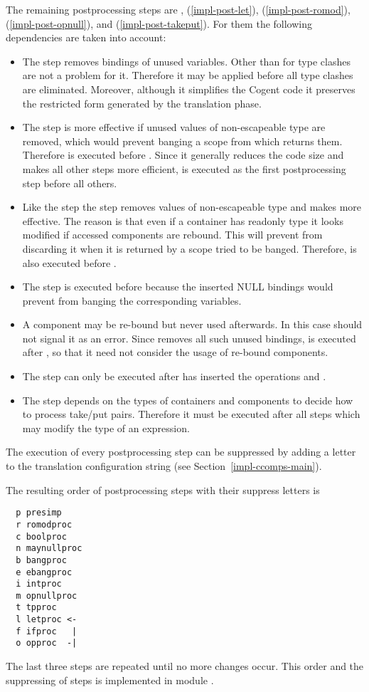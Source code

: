 The remaining postprocessing steps are , (\ref{impl-post-let}),  (\ref{impl-post-romod}),
 (\ref{impl-post-opnull}), and  (\ref{impl-post-takeput}).
For them the following dependencies are taken into account:
\begin{itemize}
\item The  step removes bindings of unused variables. Other than for  type clashes are not a problem
for it. Therefore it may be applied before all type clashes are eliminated. Moreover, although it simplifies the Cogent code it
preserves the restricted form generated by the translation phase.
\item The  step is more effective if unused values of non-escapeable type are removed, which would prevent banging
a scope from which returns them. Therefore  is executed before . Since it generally reduces the
code size and makes all other steps more efficient,  is executed as the first postprocessing step before all others.
\item Like the  step the  step removes values of non-escapeable type and makes 
more effective. The reason is that even if a container has readonly type it looks modified if accessed components are rebound.
This will prevent  from discarding it when it is returned by a scope tried to be banged. Therefore, 
is also executed before .
\item The  step is executed before  because the inserted NULL bindings would prevent 
from banging the corresponding variables.
\item A component may be re-bound but never used afterwards. In this case  should not signal it as an error.
Since  removes all such unused bindings,  is executed after , so that it need not
consider the usage of re-bound components.
\item The  step can only be executed after  has inserted the operations  and
.
\item The  step depends on the types of containers and components to decide how to process take/put pairs. Therefore
it must be executed after all steps which may modify the type of an expression.
\end{itemize}

The execution of every postprocessing step can be suppressed by adding a letter to the translation configuration string (see
Section~\ref{impl-ccomps-main}).

The resulting order of postprocessing steps with their suppress letters is
\begin{verbatim}
  p presimp
  r romodproc
  c boolproc
  n maynullproc
  b bangproc
  e ebangproc
  i intproc
  m opnullproc
  t tpproc
  l letproc <-
  f ifproc   |
  o opproc  -|
\end{verbatim}
The last three steps are repeated until no more changes occur. This order and the suppressing of steps is implemented
in module .
